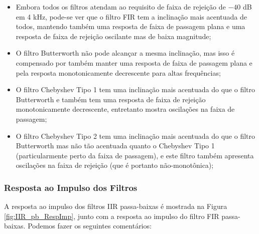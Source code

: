 \documentclass[a4paper,twoside,12pt]{article}
\begin{document}
	\begin{itemize}
		\item Embora todos os filtros atendam ao requisito de faixa de rejeição de $-40$ dB em 4 kHz, pode-se ver que o filtro FIR tem a inclinação mais acentuada de todos, mantendo também uma resposta de faixa de passagem plana e uma resposta de faixa de rejeição oscilante mas de baixa magnitude;
		
		\item O filtro Butterworth não pode alcançar a mesma inclinação, mas isso é compensado por também manter uma resposta de faixa de passagem plana e pela resposta monotonicamente decrescente para altas frequências;
		
		\item O filtro Chebyshev Tipo 1 tem uma inclinação mais acentuada do que o filtro Butterworth e também tem uma resposta de faixa de rejeição monotonicamente decrescente, entretanto mostra oscilações na faixa de passagem;
		
		\item O filtro Chebyshev Tipo 2 tem uma inclinação mais acentuada do que o filtro Butterworth mas não tão acentuada quanto o Chebyshev Tipo 1 (particularmente perto da faixa de passagem), e este filtro também apresenta oscilações na faixa de rejeição (que é portanto não-monotônica);
	\end{itemize}
	
	
	\subsubsection{Resposta ao Impulso dos Filtros}
	
	A resposta ao impulso dos filtros IIR passa-baixas é mostrada na Figura \ref{fig:IIR_pb_RespImp}, junto com a resposta ao impulso do filtro FIR passa-baixas. Podemos fazer os seguintes comentários:
	
\end{document}

